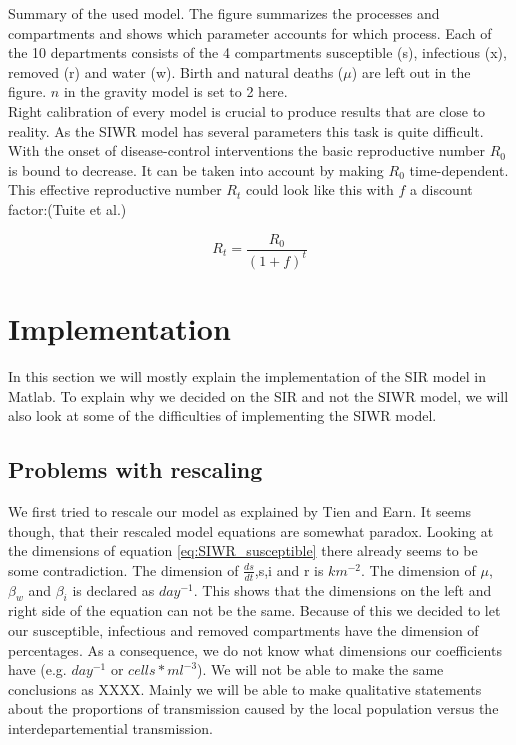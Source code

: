 \documentclass[11pt]{article}
\begin{document}
Summary of the used model. The figure summarizes the processes and compartments and shows which parameter accounts for which process. Each of the 10 departments consists of the 4 compartments susceptible (s), infectious (x), removed (r) and water (w). Birth and natural deaths ($ \mu $) are left out in the figure. $ n $ in the gravity model is set to 2 here.\\
Right calibration of every model is crucial to produce results that are close to reality. As the SIWR model has several parameters this task is quite difficult. With the onset of disease-control interventions the basic reproductive number $ R_{0} $ is bound to decrease. It can be taken into account by making $ R_{0} $ time-dependent. This effective reproductive number $ R_{t} $ could look like this with $ f $ a discount factor:(Tuite et al.)

\begin{equation}
R_{t}=\dfrac{R_{0}}{(1+f)^{t}}
\label{eq:rep_number}
\end{equation}










\section{Implementation}
In this section we will mostly explain the implementation of the SIR model in Matlab. To explain why we decided on the SIR and not the SIWR model, we will also look at some of the difficulties of implementing the SIWR model.

\subsection{Problems with rescaling}
We first tried to rescale our model as explained by Tien and Earn. It seems though, that their rescaled model equations are somewhat paradox. Looking at the dimensions of equation \eqref{eq:SIWR_susceptible} there already seems to be some contradiction. The dimension of $\frac{ds}{dt}$,s,i and r is $km^{-2}$. The dimension of $\mu$, $\beta_{w}$ and $\beta_{i}$ is declared as $day^{-1}$. This shows that the dimensions on the left and right side of the equation can not be the same. Because of this we decided to let our susceptible, infectious and removed compartments have the dimension of percentages. As a consequence, we do not know what dimensions our coefficients have (e.g. $day^{-1}$ or $cells*ml^{-3}$). We will not be able to make the same conclusions as XXXX. Mainly we will be able to make qualitative statements about the proportions of transmission caused by the local population versus the interdepartemential transmission.
\end{document}
